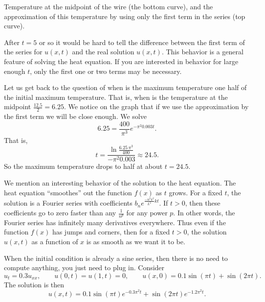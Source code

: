 \documentclass{ximera}
\begin{document}
\begin{exampleSol}
    \begin{myfig}
        \capstart
        \caption{Temperature at the midpoint of the wire (the bottom curve), and the approximation of this temperature by using only the first term in the series (top curve).\label{heat:wireexmaxfig}}
    \end{myfig}
    
    After $t=5$ or so it would be hard to tell the difference between the first term of the series for $u(x,t)$ and the real solution $u(x,t)$.  This behavior is a general feature of solving the heat equation. If you are interested in behavior for large enough $t$, only the first one or two terms may be necessary.
    
    Let us get back to the question of when is the maximum temperature one half of the initial maximum temperature.  That is, when is the temperature at the midpoint $\frac{12.5}{2} = 6.25$.  We notice on the graph that if we use the approximation by the first term we will be close enough.  We solve
    \begin{equation*}
        6.25 = \frac{400}{\pi^3} e^{-\pi^2 0.003 t} .
    \end{equation*}
    That is,
    \begin{equation*}
        t = \frac{\ln \frac{6.25\,\pi^3}{400}}{-\pi^2 0.003} \approx 24.5 .
    \end{equation*}
    So the maximum temperature drops to half at about $t=24.5$.
\end{exampleSol}

We mention an interesting behavior of the solution to the heat equation. The heat equation ``smoothes'' out the function $f(x)$ as $t$ grows.  For a fixed $t$, the solution is a Fourier series with coefficients $b_n e^{\frac{-n^2 \pi^2}{L^2} k t}$.  If $t > 0$, then these coefficients go to zero faster than any $\frac{1}{n^p}$ for any power $p$.  In other words, the Fourier series has infinitely many derivatives everywhere. Thus even if the function $f(x)$ has jumps and corners, then for a fixed $t > 0$, the solution $u(x,t)$ as a function of $x$ is as smooth as we want it to be.

\begin{example}
    When the initial condition is already a sine series, then there is no need to compute anything, you just need to plug in.  Consider
    \begin{equation*}
        u_t = 0.3 u_{xx}, \qquad u(0,t)=u(1,t)=0, \qquad u(x,0) = 0.1 \sin(\pi t) + \sin(2\pi t) .
    \end{equation*}
    The solution is then
    \begin{equation*}
        u(x,t) = 0.1 \sin(\pi t) e^{- 0.3 \pi^2 t} + \sin(2 \pi t) e^{- 1.2 \pi^2 t} .
    \end{equation*}
\end{example}
\end{document}
